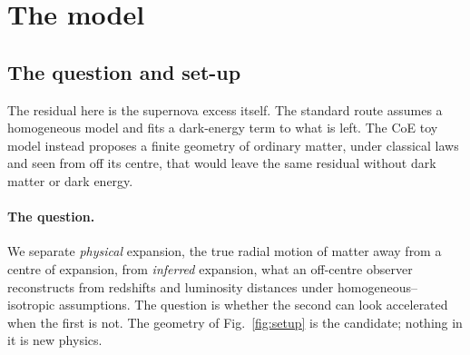\documentclass[10pt,twocolumn]{article}
\begin{document}
\section{The model}\label{sec:model}
\subsection{The question and set-up}\label{sec:setup}
The residual here is the supernova excess itself. The standard route assumes a homogeneous model and fits a dark-energy term to what is left. The CoE toy model instead proposes a finite geometry of ordinary matter, under classical laws and seen from off its centre, that would leave the same residual without dark matter or dark energy.

\paragraph{The question.} We separate \emph{physical} expansion, the true radial motion of matter away from a centre of expansion, from \emph{inferred} expansion, what an off-centre observer reconstructs from redshifts and luminosity distances under homogeneous--isotropic assumptions. The question is whether the second can look accelerated when the first is not. The geometry of Fig.~\ref{fig:setup} is the candidate; nothing in it is new physics.
\end{document}
